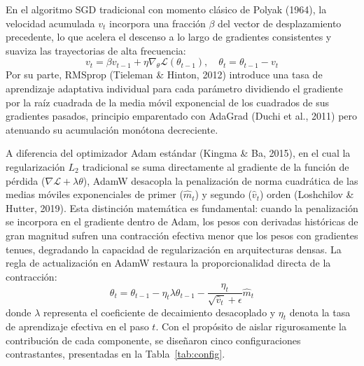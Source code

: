 \documentclass[12pt,letterpaper]{article}
\begin{document}
En el algoritmo SGD tradicional con momento clásico de Polyak (1964), la velocidad acumulada $v_t$ incorpora una fracción $\beta$ del vector de desplazamiento precedente, lo que acelera el descenso a lo largo de gradientes consistentes y suaviza las trayectorias de alta frecuencia:
\begin{equation}
v_t = \beta v_{t-1} + \eta \nabla_\theta \mathcal{L}(\theta_{t-1}), \quad \theta_t = \theta_{t-1} - v_t
\end{equation}
Por su parte, RMSprop (Tieleman \& Hinton, 2012) introduce una tasa de aprendizaje adaptativa individual para cada parámetro dividiendo el gradiente por la raíz cuadrada de la media móvil exponencial de los cuadrados de sus gradientes pasados, principio emparentado con AdaGrad (Duchi et al., 2011) pero atenuando su acumulación monótona decreciente.

A diferencia del optimizador Adam estándar (Kingma \& Ba, 2015), en el cual la regularización $L_2$ tradicional se suma directamente al gradiente de la función de pérdida ($\nabla \mathcal{L} + \lambda \theta$), AdamW desacopla la penalización de norma cuadrática de las medias móviles exponenciales de primer ($\hat{m}_t$) y segundo ($\hat{v}_t$) orden (Loshchilov \& Hutter, 2019). Esta distinción matemática es fundamental: cuando la penalización se incorpora en el gradiente dentro de Adam, los pesos con derivadas históricas de gran magnitud sufren una contracción efectiva menor que los pesos con gradientes tenues, degradando la capacidad de regularización en arquitecturas densas. La regla de actualización en AdamW restaura la proporcionalidad directa de la contracción:
\begin{equation}
\theta_{t} = \theta_{t-1} - \eta_t \lambda \theta_{t-1} - \frac{\eta_t}{\sqrt{\hat{v}_t} + \epsilon} \hat{m}_t
\end{equation}
donde $\lambda$ representa el coeficiente de decaimiento desacoplado y $\eta_t$ denota la tasa de aprendizaje efectiva en el paso $t$. Con el propósito de aislar rigurosamente la contribución de cada componente, se diseñaron cinco configuraciones contrastantes, presentadas en la Tabla~\ref{tab:config}.
\end{document}
